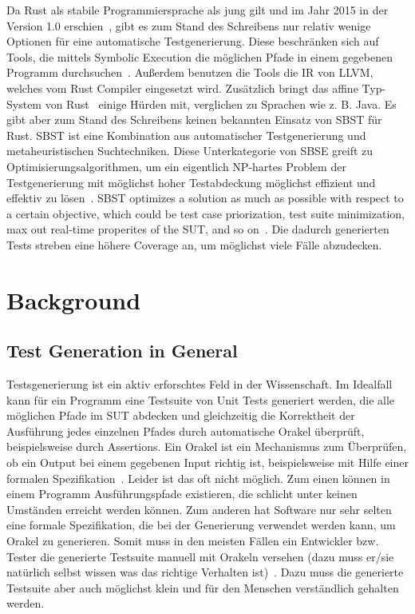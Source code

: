 \documentclass{article}
\begin{document}
Da Rust als stabile Programmiersprache als jung gilt und im Jahr 2015 in der Version 1.0 erschien~\cite{Rust10}, gibt es zum Stand des Schreibens nur relativ wenige Optionen für eine automatische Testgenerierung. Diese beschränken sich auf Tools, die mittels Symbolic Execution die möglichen Pfade in einem gegebenen Programm durchsuchen~\cite{cadar2008klee}.  Außerdem benutzen die Tools die IR von LLVM, welches vom Rust Compiler eingesetzt wird. Zusätzlich bringt das affine Typ-System von Rust~\cite{Anderson2016} einige Hürden mit, verglichen zu Sprachen wie z. B. Java. Es gibt aber zum Stand des Schreibens keinen bekannten Einsatz von \ac{SBST} für Rust. \ac{SBST} ist eine Kombination aus automatischer Testgenerierung und metaheuristischen Suchtechniken. Diese Unterkategorie von SBSE greift zu Optimisierungsalgorithmen, um ein eigentlich NP-hartes Problem der Testgenerierung mit möglichst hoher Testabdeckung möglichst effizient und effektiv zu lösen~\cite{Khari2019}. SBST optimizes a solution as much as possible with respect to a certain objective, which could be test case priorization, test suite minimization, max out real-time properites of the SUT, and so on~\cite{Khari2019}. Die dadurch generierten Tests streben eine höhere Coverage an, um möglichst viele Fälle abzudecken. 

\section{Background}
\subsection{Test Generation in General}
Testsgenerierung ist ein aktiv erforschtes Feld in der Wissenschaft. Im Idealfall kann für ein Programm eine Testsuite von Unit Tests generiert werden, die alle möglichen Pfade im \ac{SUT} abdecken und gleichzeitig die Korrektheit der Ausführung jedes einzelnen Pfades durch automatische Orakel überprüft, beispielsweise durch Assertions. Ein Orakel ist ein Mechanismus zum Überprüfen, ob ein Output bei einem gegebenen Input richtig ist, beispielsweise mit Hilfe einer formalen Spezifikation~\cite{McMinn2009}. Leider ist das oft nicht möglich. Zum einen können in einem Programm Ausführungspfade existieren, die schlicht unter keinen Umständen erreicht werden können. Zum anderen hat Software nur sehr selten eine formale Spezifikation, die bei der Generierung verwendet werden kann, um Orakel zu generieren. Somit muss in den meisten Fällen ein Entwickler bzw. Tester die generierte Testsuite manuell mit Orakeln versehen (dazu muss er/sie natürlich selbst wissen was das richtige Verhalten ist)~\cite{Fraser_2013}. Dazu muss die generierte Testsuite aber auch möglichst klein und für den Menschen verständlich gehalten werden. 
\end{document}

